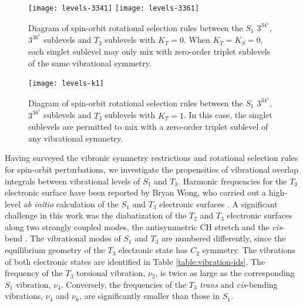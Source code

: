 \begin{figure}
  \caption{Diagram of spin-orbit rotational selection rules between
    the $S_1$ $3^34^1$, $3^36^1$  sublevels and $T_3$ sublevels
    with $K_T=0$.  When $K_T=K_S=0$, each singlet sublevel may only
    mix with zero-order triplet sublevels of the same vibrational
    symmetry.}
  \label{fig:levels-k0}
  \centering
  \vspace{5mm}
  \texttt{[image: levels-3341]}
  \texttt{[image: levels-3361]}  
\end{figure}

\begin{figure}
  \caption{Diagram of spin-orbit rotational selection rules between
    the $S_1$ $3^34^1$, $3^36^1$  sublevels and $T_3$ sublevels
    with $K_T=1$.  In this case, the singlet sublevels are permitted
    to mix with a zero-order triplet sublevel of any vibrational
    symmetry.}
  \label{fig:levels-k1}
  \centering
  \vspace{5mm}
  \texttt{[image: levels-k1]}
\end{figure}


Having surveyed the vibronic symmetry restrictions and rotational
selection rules for spin-orbit perturbations, we investigate the
propensities of vibrational overlap integrals between vibrational
levels of $S_1$ and $T_3$.  Harmonic frequencies for the $T_3$
electronic surface have been reported by Bryan Wong, who carried out a
high-level \emph{ab initio} calculation of the $S_1$ and $T_3$
electronic surfaces \cite{wong07}.  A significant challenge in this
work was the diabatization of the $T_2$ and $T_3$ electronic surfaces
along two strongly coupled modes, the antisymmetric CH stretch and the
\emph{cis}-bend \cite{thom07}.  The vibrational modes of $S_1$ and
$T_3$ are numbered differently, since the equilibrium geometry of the
$T_3$ electronic state has $C_2$ symmetry.  The vibrations of both
electronic states are identified in Table \ref{table:vibration-ids}.
The frequency of the $T_3$ torsional vibration, $\nu_2$, is twice as
large as the corresponding $S_1$ vibration, $\nu_4$.  Conversely, the
frequencies of the $T_3$ \emph{trans} and \emph{cis}-bending
vibrations, $\nu_4$ and $\nu_6$, are significantly smaller than those
in $S_1$.

